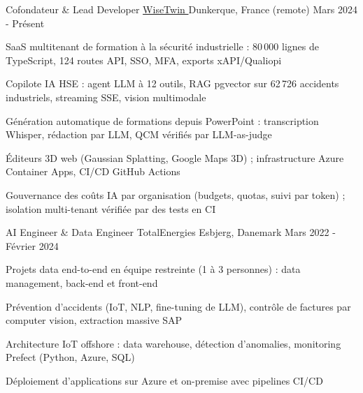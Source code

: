 


\begin{cventries}


\cventry
{Cofondateur \& Lead Developer} %
{\href{https://www.wisetwin.eu}{WiseTwin {\tiny\textcolor{black}{\faExternalLink}}}} %
{Dunkerque, France (remote)} %
{Mars 2024 - Présent} %
{ %
\begin{cvitems}
\item {SaaS multitenant de formation à la sécurité industrielle : 80\,000 lignes de TypeScript, 124 routes API, SSO, MFA, exports xAPI/Qualiopi}
\item {Copilote IA HSE : agent LLM à 12 outils, RAG pgvector sur 62\,726 accidents industriels, streaming SSE, vision multimodale}
\item {Génération automatique de formations depuis PowerPoint : transcription Whisper, rédaction par LLM, QCM vérifiés par LLM-as-judge}
\item {Éditeurs 3D web (Gaussian Splatting, Google Maps 3D) ; infrastructure Azure Container Apps, CI/CD GitHub Actions}
\item {Gouvernance des coûts IA par organisation (budgets, quotas, suivi par token) ; isolation multi-tenant vérifiée par des tests en CI}
\end{cvitems}
}
\vspace{1em}


\cventry
{AI Engineer \& Data Engineer} %
{TotalEnergies} %
{Esbjerg, Danemark} %
{Mars 2022 - Février 2024} %
{ %
\begin{cvitems}
\item {Projets data end-to-end en équipe restreinte (1 à 3 personnes) : data management, back-end et front-end}
\item {Prévention d'accidents (IoT, NLP, fine-tuning de LLM), contrôle de factures par computer vision, extraction massive SAP}
\item {Architecture IoT offshore : data warehouse, détection d'anomalies, monitoring Prefect (Python, Azure, SQL)}
\item {Déploiement d'applications sur Azure et on-premise avec pipelines CI/CD}
\end{cvitems}
}
\vspace{1em}


\end{cventries}
